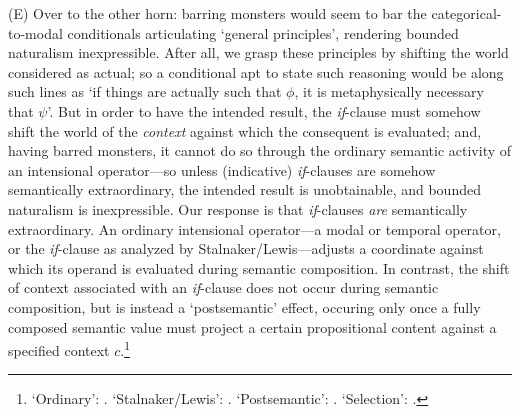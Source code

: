 \documentclass[12pt]{article}
\begin{document}
(E) Over to the other horn: barring monsters would seem to bar the
categorical-to-modal conditionals articulating `general principles', rendering
bounded naturalism inexpressible. After all, we grasp these principles by
shifting the world considered as actual; so a conditional apt to state such
reasoning would be along such lines as `if things are actually such that
$\phi$, it is metaphysically necessary that $\psi$'. But in order to have the
intended result, the \emph{if}-clause must somehow shift the world of the
\emph{context} against which the consequent is evaluated; and, having barred
monsters, it cannot do so through the ordinary semantic activity of an
intensional operator---so unless (indicative) \emph{if}-clauses are somehow
semantically extraordinary, the intended result is unobtainable, and bounded
naturalism is inexpressible.  Our response is that \emph{if}-clauses
\emph{are} semantically extraordinary. An ordinary intensional operator---a
modal or temporal operator, or the \emph{if}-clause as analyzed by
Stalnaker/Lewis---adjusts a coordinate against which its operand is evaluated
during semantic composition. In contrast, the shift of context associated with
an \emph{if}-clause does not occur during semantic composition, but is instead
a `postsemantic' effect, occuring only once a fully composed semantic value
must project a certain propositional content against a specified context
$c$.\footnote{`Ordinary': \citep[pp.~27--31]{lewis80icc}. `Stalnaker/Lewis':
\citep{stalnakeratoc,lewis73}. `Postsemantic': \citep{macfarlane14}.
`Selection': \citep{stalnakeratoc,Cariani2018-CARWDB-6}.}
 
\begin{comment} Picturesquely, \emph{if $\phi$} `punches a hole' in the
semantic value of its operand, `shaped' like those contexts verifying $\phi$;
a content appropriate to $c$ can only be assigned to the sentence by `filling
the hole': to wit interpreting the operand in a context (selected by $c$)
verifying $\phi$.  
\end{comment}
\end{document}
